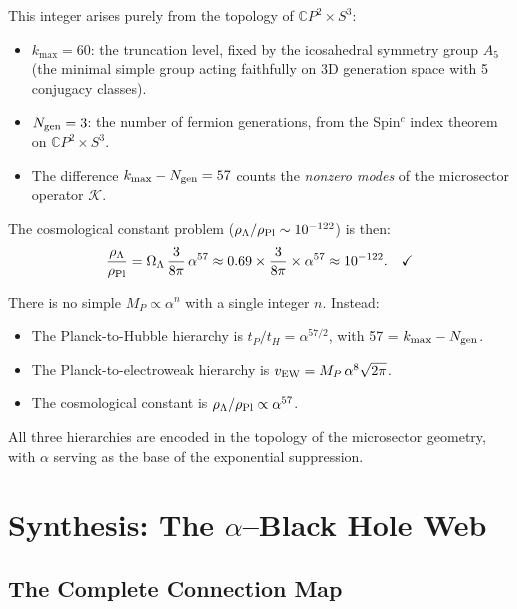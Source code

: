 \documentclass[11pt,a4paper]{article}
\begin{document}
This integer arises purely from the topology of $\mathbb{C}P^2 \times S^3$:
\begin{itemize}
\item $k_{\max} = 60$: the truncation level, fixed by the icosahedral symmetry group $A_5$ (the minimal simple group acting faithfully on 3D generation space with 5 conjugacy classes).
\item $N_{\rm gen} = 3$: the number of fermion generations, from the Spin$^c$ index theorem on $\mathbb{C}P^2 \times S^3$.
\item The difference $k_{\max} - N_{\rm gen} = 57$ counts the \emph{nonzero modes} of the microsector operator $\mathcal{K}$.
\end{itemize}

The cosmological constant problem ($\rho_\Lambda/\rho_{\rm Pl} \sim 10^{-122}$) is then:
\begin{equation}
\frac{\rho_\Lambda}{\rho_{\rm Pl}} = \Omega_\Lambda\,\frac{3}{8\pi}\,\alpha^{57} \approx 0.69 \times \frac{3}{8\pi}\times\alpha^{57} \approx 10^{-122}. \quad\checkmark
\end{equation}

\begin{tcolorbox}[colback=green!5!white, colframe=green!50!black, title=Planck Mass and $\alpha$]
There is no simple $M_P \propto \alpha^n$ with a single integer $n$. Instead:
\begin{itemize}
\item The Planck-to-Hubble hierarchy is $t_P/t_H = \alpha^{57/2}$, with 57 = $k_{\max} - N_{\rm gen}$.
\item The Planck-to-electroweak hierarchy is $v_{\rm EW} = M_P\,\alpha^8\sqrt{2\pi}$.
\item The cosmological constant is $\rho_\Lambda/\rho_{\rm Pl} \propto \alpha^{57}$.
\end{itemize}
All three hierarchies are encoded in the topology of the microsector geometry, with $\alpha$ serving as the base of the exponential suppression.
\end{tcolorbox}


\section{Synthesis: The $\alpha$--Black Hole Web}
\label{sec:synthesis}

\subsection{The Complete Connection Map}
\end{document}
